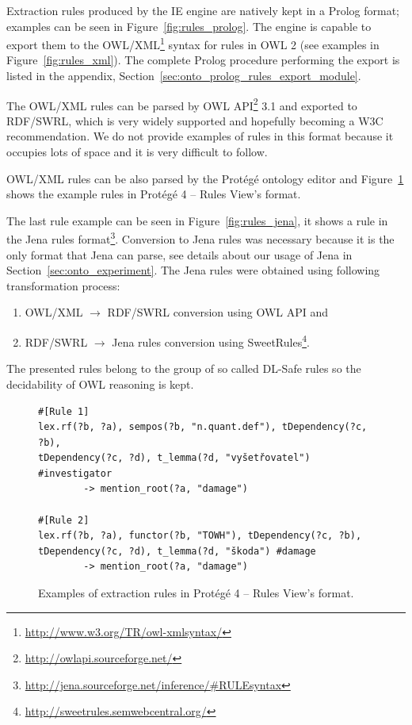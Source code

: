 \clearpage

Extraction rules produced by the IE engine are natively kept in a Prolog format; examples can be seen in Figure~\ref{fig:rules_prolog}. The engine is capable to export them to the OWL/XML\footnote{\url{http://www.w3.org/TR/owl-xmlsyntax/}} syntax for rules in OWL 2 \citep{GHPP09a} (see examples in Figure~\ref{fig:rules_xml}). The complete Prolog procedure performing the export is listed in the appendix, Section~\ref{sec:onto_prolog_rules_export_module}.




The OWL/XML rules can be parsed by OWL API\footnote{\url{http://owlapi.sourceforge.net/}} 3.1 
and exported to RDF/SWRL, which is very widely supported and hopefully becoming a W3C recommendation. We do not provide examples of rules in this format because it occupies lots of space and it is very difficult to follow.


OWL/XML rules can be also parsed by the Prot\'{e}g\'{e} ontology editor and Figure~\ref{fig:rules_protege} shows the example rules in Prot\'{e}g\'{e} 4 -- Rules View's format. 

The last rule example can be seen in Figure~\ref{fig:rules_jena}, it shows a rule in the Jena rules format\footnote{\url{http://jena.sourceforge.net/inference/#RULEsyntax}}. Conversion to Jena rules was necessary because it is the only format that Jena can parse, see details about our usage of Jena in Section~\ref{sec:onto_experiment}. The Jena rules were obtained using following transformation process:
\begin{enumerate}
	\item OWL/XML $\rightarrow$ RDF/SWRL conversion using OWL API and 
	\item RDF/SWRL $\rightarrow$ Jena rules conversion using SweetRules\footnote{\url{http://sweetrules.semwebcentral.org/}}.
\end{enumerate}


The presented rules belong to the group of so called DL-Safe rules \citep{Motik:DL-Safe-rules} so the decidability of OWL reasoning is kept.






\begin{figure}[b!]
\begin{verbatim}
#[Rule 1]
lex.rf(?b, ?a), sempos(?b, "n.quant.def"), tDependency(?c, ?b),
tDependency(?c, ?d), t_lemma(?d, "vyšetřovatel") #investigator
		-> mention_root(?a, "damage")

#[Rule 2]
lex.rf(?b, ?a), functor(?b, "TOWH"), tDependency(?c, ?b),
tDependency(?c, ?d), t_lemma(?d, "škoda") #damage
		-> mention_root(?a, "damage")
\end{verbatim}
	\caption{Examples of extraction rules in Prot\'{e}g\'{e} 4 -- Rules View's format.}
	\label{fig:rules_protege}
\end{figure}



